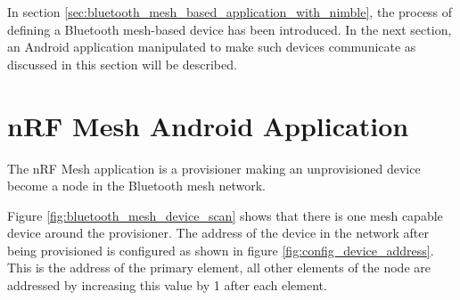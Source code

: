 \documentclass[\main/main.tex]{subfiles}
\begin{document}
In section \ref{sec:bluetooth_mesh_based_application_with_nimble}, the process of defining a Bluetooth mesh-based device has been introduced. In the next section, an Android application manipulated to make such devices communicate as discussed in this section will be described.
\section{nRF Mesh Android Application}
The nRF Mesh application is a provisioner making an unprovisioned device become a node in the Bluetooth mesh network. 

Figure \ref{fig:bluetooth_mesh_device_scan} shows that there is one mesh capable device around the provisioner. The address of the device in the network after being provisioned is configured as shown in figure \ref{fig:config_device_address}. This is the address of the primary element, all other elements of the node are addressed by increasing this value by 1 after each element.
\end{document}
